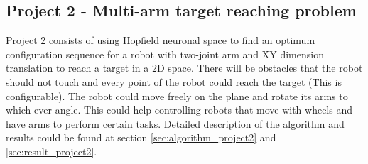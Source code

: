 \subsection{Project 2 - Multi-arm target reaching problem}
\label{ssec:project2}

Project 2 consists of using Hopfield neuronal space to find an optimum configuration sequence for a robot
with two-joint arm and XY dimension translation to reach a target in a 2D space.
There will be obstacles that the robot should not touch and every point of the robot could reach the target
(This is configurable).
The robot could move freely on the plane and rotate its arms to which ever angle.
This could help controlling robots that move with wheels and have arms to perform certain tasks.
Detailed description of the algorithm and results could be found at section \ref{sec:algorithm_project2} and
\ref{sec:result_project2}.
